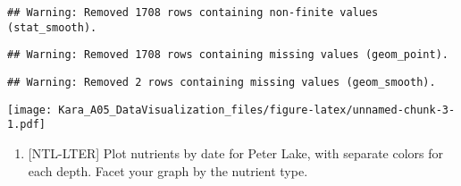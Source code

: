 \documentclass[]{article}
\newenvironment{Shaded}{\begin{snugshade}}{\end{snugshade}}
\newcommand{\KeywordTok}[1]{\textcolor[rgb]{0.13,0.29,0.53}{\textbf{#1}}}
\newcommand{\DataTypeTok}[1]{\textcolor[rgb]{0.13,0.29,0.53}{#1}}
\newcommand{\DecValTok}[1]{\textcolor[rgb]{0.00,0.00,0.81}{#1}}
\newcommand{\StringTok}[1]{\textcolor[rgb]{0.31,0.60,0.02}{#1}}
\newcommand{\CommentTok}[1]{\textcolor[rgb]{0.56,0.35,0.01}{\textit{#1}}}
\newcommand{\OperatorTok}[1]{\textcolor[rgb]{0.81,0.36,0.00}{\textbf{#1}}}
\newcommand{\NormalTok}[1]{#1}
\providecommand{\tightlist}{%
  \setlength{\itemsep}{0pt}\setlength{\parskip}{0pt}}
\begin{document}
\begin{Shaded}
\end{Shaded}

\begin{verbatim}
## Warning: Removed 1708 rows containing non-finite values (stat_smooth).
\end{verbatim}

\begin{verbatim}
## Warning: Removed 1708 rows containing missing values (geom_point).
\end{verbatim}

\begin{verbatim}
## Warning: Removed 2 rows containing missing values (geom_smooth).
\end{verbatim}

\texttt{[image: Kara\_A05\_DataVisualization\_files/figure-latex/unnamed-chunk-3-1.pdf]}

\begin{enumerate}
\def\labelenumi{\arabic{enumi}.}
\setcounter{enumi}{4}
\tightlist
\item
  {[}NTL-LTER{]} Plot nutrients by date for Peter Lake, with separate
  colors for each depth. Facet your graph by the nutrient type.
\end{enumerate}
\end{document}
